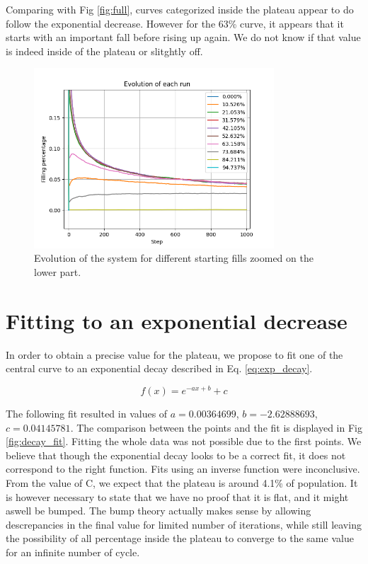 \documentclass{article}
\begin{document}
Comparing with Fig \ref*{fig:full}, curves categorized inside the plateau appear to do follow the
exponential decrease. However for the 63\% curve, it appears that it starts with an
important fall before rising up again. We do not know if that value is indeed inside
of the plateau or slitghtly off.
\begin{figure}[htbp]
    \centering
    \includegraphics[width=0.8\textwidth]{res/evolution_zoom.png}
    \caption{Evolution of the system for different starting fills zoomed on the lower part.}
    \label{fig:evolution_zoom}
\end{figure}

\section{Fitting to an exponential decrease}
In order to obtain a precise value for the plateau, we propose to fit one of the central
curve to an exponential decay described in Eq. \ref*{eq:exp_decay}.

\begin{equation}
    f(x) = e^{-ax + b} + c
    \label{eq:exp_decay}
\end{equation}

The following fit resulted in values of $a=0.00364699$, $b=-2.62888693$,
$c=0.04145781$. The comparison between the points and the fit is displayed in 
Fig \ref*{fig:decay_fit}. Fitting the whole data was not possible due to the first points.
We believe that though the exponential decay looks to be a correct fit, it
does not correspond to the right function. Fits using an inverse function were
inconclusive. From the value of C, we expect that the plateau is around 4.1\%
of population. It is however necessary to state that we have no proof that it is
flat, and it might aswell be bumped. The bump theory actually makes sense by allowing
descrepancies in the final value for limited number of iterations, while still leaving the 
possibility of all percentage inside the plateau to converge to the same value for an infinite number
of cycle. 
\end{document}
